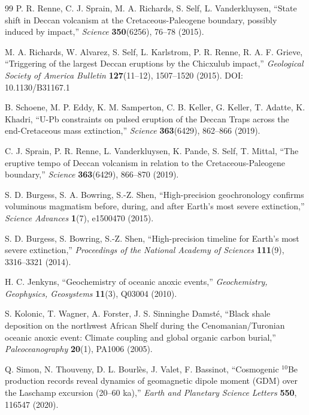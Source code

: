 \documentclass[11pt,a4paper]{article}
\begin{document}
\begin{thebibliography}{99}
		P. R. Renne, C. J. Sprain, M. A. Richards, S. Self, L. Vanderkluysen, ``State shift in Deccan volcanism at the Cretaceous-Paleogene boundary, possibly induced by impact,''
		\emph{Science} \textbf{350}(6256), 76–78 (2015).
		
		M. A. Richards, W. Alvarez, S. Self, L. Karlstrom, P. R. Renne, R. A. F. Grieve, ``Triggering of the largest Deccan eruptions by the Chicxulub impact,''
		\emph{Geological Society of America Bulletin} \textbf{127}(11–12), 1507–1520 (2015). DOI: 10.1130/B31167.1
		
		B. Schoene, M. P. Eddy, K. M. Samperton, C. B. Keller, G. Keller, T. Adatte, K. Khadri, ``U-Pb constraints on pulsed eruption of the Deccan Traps across the end-Cretaceous mass extinction,''
		\emph{Science} \textbf{363}(6429), 862–866 (2019).
		
		C. J. Sprain, P. R. Renne, L. Vanderkluysen, K. Pande, S. Self, T. Mittal, ``The eruptive tempo of Deccan volcanism in relation to the Cretaceous-Paleogene boundary,''
		\emph{Science} \textbf{363}(6429), 866–870 (2019).
		
		S. D. Burgess, S. A. Bowring, S.-Z. Shen, ``High-precision geochronology confirms voluminous magmatism before, during, and after Earth's most severe extinction,''
		\emph{Science Advances} \textbf{1}(7), e1500470 (2015).
		
		S. D. Burgess, S. Bowring, S.-Z. Shen, ``High-precision timeline for Earth's most severe extinction,''
		\emph{Proceedings of the National Academy of Sciences} \textbf{111}(9), 3316–3321 (2014).
		
		H. C. Jenkyns, ``Geochemistry of oceanic anoxic events,''
		\emph{Geochemistry, Geophysics, Geosystems} \textbf{11}(3), Q03004 (2010).
		
		S. Kolonic, T. Wagner, A. Forster, J. S. Sinninghe Damsté, ``Black shale deposition on the northwest African Shelf during the Cenomanian/Turonian oceanic anoxic event: Climate coupling and global organic carbon burial,''
		\emph{Paleoceanography} \textbf{20}(1), PA1006 (2005).
		
		Q. Simon, N. Thouveny, D. L. Bourlès, J. Valet, F. Bassinot, ``Cosmogenic \(^{10}\)Be production records reveal dynamics of geomagnetic dipole moment (GDM) over the Laschamp excursion (20–60 ka),''
		\emph{Earth and Planetary Science Letters} \textbf{550}, 116547 (2020).
		

\end{thebibliography}
\end{document}

